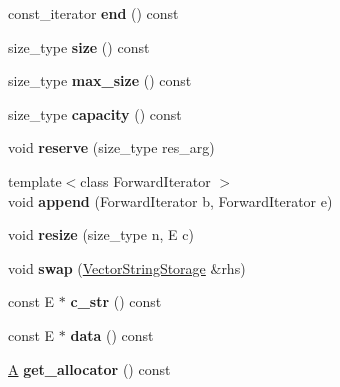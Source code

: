 \begin{DoxyCompactItemize}
\item 
\hypertarget{classVectorStringStorage_af23ec2ca002a9d83c5c685b856ffac85}{}const\+\_\+iterator {\bfseries end} () const \label{classVectorStringStorage_af23ec2ca002a9d83c5c685b856ffac85}

\item 
\hypertarget{classVectorStringStorage_a7720e60f200dfe8b1a4e2f717ac82944}{}size\+\_\+type {\bfseries size} () const \label{classVectorStringStorage_a7720e60f200dfe8b1a4e2f717ac82944}

\item 
\hypertarget{classVectorStringStorage_acc115dc1e2ac41638fe0ed56ca69bc31}{}size\+\_\+type {\bfseries max\+\_\+size} () const \label{classVectorStringStorage_acc115dc1e2ac41638fe0ed56ca69bc31}

\item 
\hypertarget{classVectorStringStorage_ada1832d166a399d5dd025ced7e5e3015}{}size\+\_\+type {\bfseries capacity} () const \label{classVectorStringStorage_ada1832d166a399d5dd025ced7e5e3015}

\item 
\hypertarget{classVectorStringStorage_a7dd8cab5a1a0bcf63f77c7258e85de17}{}void {\bfseries reserve} (size\+\_\+type res\+\_\+arg)\label{classVectorStringStorage_a7dd8cab5a1a0bcf63f77c7258e85de17}

\item 
\hypertarget{classVectorStringStorage_a9c513cdf957f6eea3cb848c32e183dc9}{}{\footnotesize template$<$class Forward\+Iterator $>$ }\\void {\bfseries append} (Forward\+Iterator b, Forward\+Iterator e)\label{classVectorStringStorage_a9c513cdf957f6eea3cb848c32e183dc9}

\item 
\hypertarget{classVectorStringStorage_a215ba130f285d39fbaa9cfd4531362d5}{}void {\bfseries resize} (size\+\_\+type n, E c)\label{classVectorStringStorage_a215ba130f285d39fbaa9cfd4531362d5}

\item 
\hypertarget{classVectorStringStorage_a5538ae4711efe7a65332cce949395d65}{}void {\bfseries swap} (\hyperlink{classVectorStringStorage}{Vector\+String\+Storage} \&rhs)\label{classVectorStringStorage_a5538ae4711efe7a65332cce949395d65}

\item 
\hypertarget{classVectorStringStorage_a2598346b596be60d91fa276f93db9bba}{}const E $\ast$ {\bfseries c\+\_\+str} () const \label{classVectorStringStorage_a2598346b596be60d91fa276f93db9bba}

\item 
\hypertarget{classVectorStringStorage_a2f0af53671d4058ffdb89ae6c6df2607}{}const E $\ast$ {\bfseries data} () const \label{classVectorStringStorage_a2f0af53671d4058ffdb89ae6c6df2607}

\item 
\hypertarget{classVectorStringStorage_a915d589f563c140dfb6c10f1940a07a5}{}\hyperlink{structA}{A} {\bfseries get\+\_\+allocator} () const \label{classVectorStringStorage_a915d589f563c140dfb6c10f1940a07a5}

\end{DoxyCompactItemize}


